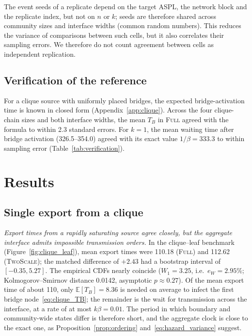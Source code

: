 \documentclass[a4paper,fleqn]{cas-sc}
\newcommand{\Full}{\textup{\textsc{Full}}}
\newcommand{\TS}{\textup{\textsc{TwoScale}}}
\newcommand{\eW}{e_{W}}
\begin{document}
The event seeds of a replicate depend on the target ASPL, the network block and the replicate index, but not on $n$ or $k$; seeds are therefore shared across community sizes and interface widths (common random numbers). This reduces the variance of comparisons between such cells, but it also correlates their sampling errors. We therefore do not count agreement between cells as independent replication.

\subsection{Verification of the reference}

For a clique source with uniformly placed bridges, the expected bridge-activation time is known in closed form (Appendix~\ref{app:clique}). Across the four clique-chain sizes and both interface widths, the mean $T_B$ in \Full{} agreed with the formula to within 2.3 standard errors. For $k=1$, the mean waiting time after bridge activation (326.5--354.0) agreed with its exact value $1/\beta=333.3$ to within sampling error (Table~\ref{tab:verification}).

\clearpage
\section{Results}
\label{sec:results}

\subsection{Single export from a clique}
\label{sec:res_clique}

\emph{Export times from a rapidly saturating source agree closely, but the aggregate interface admits impossible transmission orders.} In the clique--leaf benchmark (Figure~\ref{fig:clique_leaf}), mean export times were 110.18 (\Full{}) and 112.62 (\TS{}); the matched difference of $+2.43$ had a bootstrap interval of $[-0.35,5.27]$. The empirical CDFs nearly coincide ($W_1=3.25$, i.e.\ $\eW=2.95\%$; Kolmogorov--Smirnov distance 0.0142, asymptotic $p\approx0.27$). Of the mean export time of about 110, only $\mathbb{E}[T_B]=8.36$ is needed on average to infect the first bridge node~\eqref{eq:clique_TB}; the remainder is the wait for transmission across the interface, at a rate of at most $k\beta=0.01$. The period in which boundary and community-wide states differ is therefore short, and the aggregate clock is close to the exact one, as Proposition~\ref{prop:ordering} and~\eqref{eq:hazard_variance} suggest.
\end{document}

